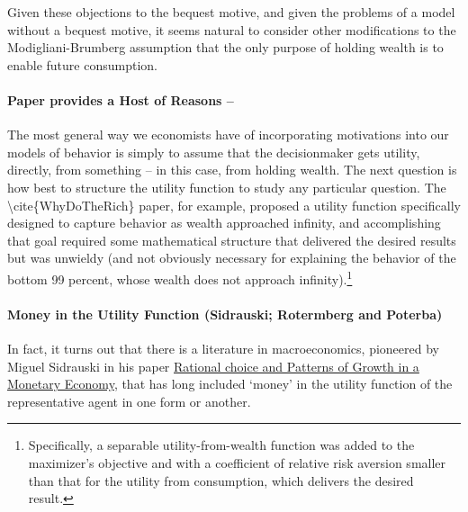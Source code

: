 \documentclass{article}
\begin{document}

Given these objections to the bequest motive, and given the problems of a model without a bequest motive, it seems natural to consider other modifications to the Modigliani-Brumberg assumption that the only purpose of holding wealth is to enable future consumption.

\paragraph{Paper provides a Host of Reasons --}


The most general way we economists have of incorporating motivations into our models of behavior is simply to assume that the decisionmaker gets utility, directly, from something -- in this case, from holding wealth. The next question is how best to structure the utility function to study any particular question. The {\textbackslash}cite\{WhyDoTheRich\} paper, for example, proposed a utility function specifically designed to capture behavior as wealth approached infinity, and accomplishing that goal required some mathematical structure that delivered the desired results but was unwieldy (and not obviously necessary for explaining the behavior of the bottom 99 percent, whose wealth does not approach infinity).\footnote{Specifically, a separable utility-from-wealth function was added to the maximizer's objective and with a coefficient of relative risk aversion smaller than that for the utility from consumption, which delivers the desired result.}

\paragraph{Money in the Utility Function (Sidrauski; Rotermberg and Poterba)}

In fact, it turns out that there is a literature in macroeconomics, pioneered by Miguel Sidrauski in his paper \href{}{Rational choice and Patterns of Growth in a Monetary Economy}, that has long included `money' in the utility function of the representative agent in one form or another.
\end{document}
